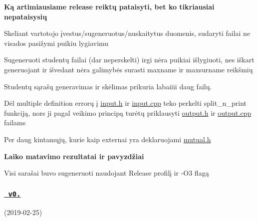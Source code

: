 {\bfseries{Ką artimiausiame release reiktų pataisyti, bet ko tikriausiai nepataisysių}}
\begin{DoxyItemize}
\item Skeliant vartotojo įvestus/sugeneruotus/nuskaitytus duomenis, sudaryti failai ne visados pasižymi puikiu lygiavimu
\item Sugeneruoti studentų failai (dar neperskelti) irgi nėra puikiai išlygiuoti, nes iškart generuojant ir išvedant nėra galimybės surasti maxname ir maxsurname reikšmių
\item Studentų sąrašų generavimas ir skėlimas prikuria labaiiii daug failų.
\item Dėl multiple definition errorų į {\ttfamily \mbox{\hyperlink{_input_8h}{input.\+h}}} ir {\ttfamily \mbox{\hyperlink{_input_8cpp}{input.\+cpp}}} teko perkelti split\+\_\+n\+\_\+print funkciją, nors ji pagal veikimo principą turėtų priklausyti {\ttfamily \mbox{\hyperlink{_output_8h}{output.\+h}}} ir {\ttfamily \mbox{\hyperlink{_output_8cpp}{output.\+cpp}}} failams
\item Per daug kintamųjų, kurie kaip extern\textquotesingle{}ai yra deklaruojami {\ttfamily \mbox{\hyperlink{_mutual_8h}{mutual.\+h}}}
\end{DoxyItemize}

{\bfseries{Laiko matavimo rezultatai ir pavyzdžiai}}
\begin{DoxyItemize}
\item Visi sarašai buvo sugeneruoti naudojant Release profilį ir -\/O3 flagą
\end{DoxyItemize}



 \subsubsection*{\href{https://github.com/gitguuddd/Obj_Duomenu_apdorojimas/releases/tag/v0.3}{\texttt{ v0.}}}

(2019-\/02-\/25)

